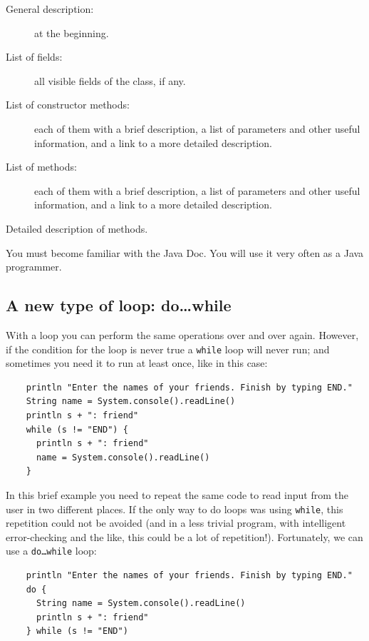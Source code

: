 \begin{description}
\item[General description: ] at the beginning.
\item[List of fields: ] all visible fields of the class, if any.
\item[List of constructor methods: ] each of them with a brief
  description, a list of parameters and other useful information, and
  a link to a more detailed description.
\item[List of methods: ] each of them with a brief
  description, a list of parameters and other useful information, and
  a link to a more detailed description.
\item[Detailed description of methods. ] 
\end{description}

You must become familiar with the Java Doc. You will use it very often
as a Java programmer. 

\subsection{A new type of loop: do\ldots while}
\label{sec:new-type-loop}

With a loop you can perform the same operations over and over
again. However, if the condition for the loop is never true a
\texttt{while} loop will never run; and sometimes you need it to run
at least once, like in this case:

\begin{verbatim}
    println "Enter the names of your friends. Finish by typing END."
    String name = System.console().readLine()
    println s + ": friend"
    while (s != "END") {
      println s + ": friend"
      name = System.console().readLine()
    }
\end{verbatim}

In this brief example you need to repeat the same code to read input
from the user in two different places. If
the only way to do loops was using \texttt{while}, this repetition
could not be avoided (and in a less trivial program, with
intelligent error-checking and the like, this could be a lot of
repetition!). Fortunately, we can use a \texttt{do\ldots while} loop: 

\begin{verbatim}
    println "Enter the names of your friends. Finish by typing END."
    do {
      String name = System.console().readLine()
      println s + ": friend"
    } while (s != "END")
\end{verbatim}


